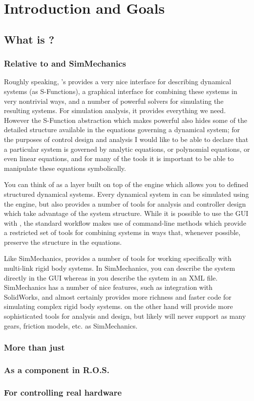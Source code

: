 \chapter{Introduction and Goals}



\section{What is \drake?}

\subsection{Relative to \simulink and SimMechanics}

Roughly speaking, \matlab's \simunlink provides a very nice interface for describing dynamical systems (as S-Functions), a graphical interface for combining these systems in very nontrivial ways, and a number of powerful solvers for simulating the resulting systems.  For simulation analysis, it provides everything we need.   However the S-Function abstraction which makes \simulink powerful also hides some of the detailed structure available in the equations governing a dynamical system; for the purposes of control design and analysis I would like to be able to declare that a particular system is governed by analytic equations, or polynomial equations, or even linear equations, and for many of the tools it is important to be able to manipulate these equations symbolically.   

You can think of \drake as a layer built on top of the \simulink engine which allows you to defined structured dynamical systems.  Every dynamical system in \drake can be simulated using the \simulink engine, but \drake also provides a number of tools for analysis and controller design which take advantage of the system structure.  While it is possible to use the \simulink GUI with \drake, the standard workflow makes use of command-line methods which provide a restricted set of tools for combining systems in ways that, whenever possible, preserve the structure in the equations.  

Like SimMechanics, \drake provides a number of tools for working specifically with multi-link rigid body systems.  In SimMechanics, you can describe the system directly in the GUI whereas in \drake you describe the system in an XML file.  SimMechanics has a number of nice features, such as integration with SolidWorks, and almost certainly provides more richness and faster code for simulating complex rigid body systems.  \drake on the other hand will provide more sophisticated tools for analysis and design, but likely will never support as many gears, friction models, etc. as SimMechanics.  

\subsection{More than just \matlab}

\subsection{As a component in R.O.S.}

\subsection{For controlling real hardware}

